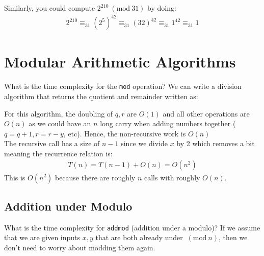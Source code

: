 \documentclass[14pt]{extarticle}
\newcommand{\Mod}[1]{\ (\mathrm{mod}\ #1)}
\begin{document}
    Similarly, you could compute $2^{210} \Mod{31}$ by doing:
    \begin{align*}
        2^{210} \equiv_{31} \left(2^5\right)^{42} \equiv_{31} (32)^{42} 
        \equiv_{31} 1^{42} \equiv_{31} 1
    \end{align*}

    \section{Modular Arithmetic Algorithms}
    What is the time complexity for the \texttt{mod} operation? We can write
    a division algorithm that returns the quotient and remainder written as:

    \begin{algorithm}[H]
    \end{algorithm}

    For this algorithm, the doubling of $q, r$ are $O(1)$ and all other
    operations are $O(n)$ as we could have an $n$ long carry when adding
    numbers together ($q = q + 1, r = r - y$, etc). Hence, the non-recursive
    work is $O(n)$\\

    The recursive call has a size of $n - 1$ since we divide $x$ by 2
    which removes a bit meaning the recurrence relation is:
    \begin{align*}
        T(n) = T(n - 1) + O(n) = O(n^2)
    \end{align*}
    This is $O(n^2)$ because there are roughly $n$ calls with roughly $O(n)$.

    \subsection{Addition under Modulo}
    What is the time complexity for \texttt{addmod} (addition under a modulo)?
    If we assume that we are given inputs $x, y$ that are both already under
    $\Mod{n}$, then we don't need to worry about modding them again.\\
\end{document}
